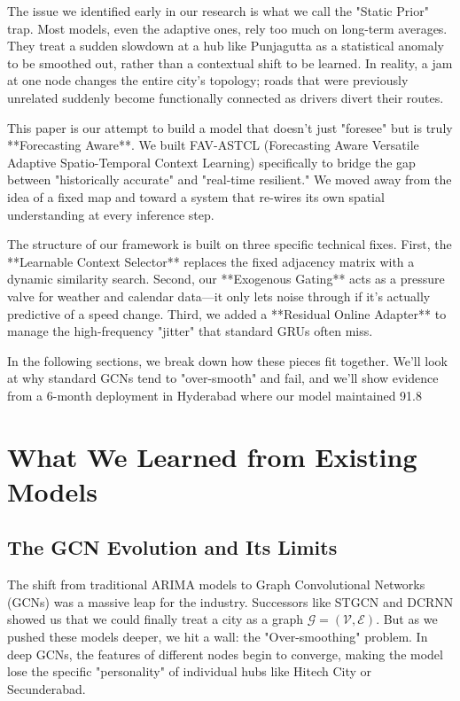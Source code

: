 \documentclass[11pt,a4paper]{article}
\begin{document}
The issue we identified early in our research is what we call the "Static Prior" trap. Most models, even the adaptive ones, rely too much on long-term averages. They treat a sudden slowdown at a hub like Punjagutta as a statistical anomaly to be smoothed out, rather than a contextual shift to be learned. In reality, a jam at one node changes the entire city's topology; roads that were previously unrelated suddenly become functionally connected as drivers divert their routes. 

This paper is our attempt to build a model that doesn't just "foresee" but is truly **Forecasting Aware**. We built FAV-ASTCL (Forecasting Aware Versatile Adaptive Spatio-Temporal Context Learning) specifically to bridge the gap between "historically accurate" and "real-time resilient." We moved away from the idea of a fixed map and toward a system that re-wires its own spatial understanding at every inference step. 

The structure of our framework is built on three specific technical fixes. First, the **Learnable Context Selector** replaces the fixed adjacency matrix with a dynamic similarity search. Second, our **Exogenous Gating** acts as a pressure valve for weather and calendar data—it only lets noise through if it's actually predictive of a speed change. Third, we added a **Residual Online Adapter** to manage the high-frequency "jitter" that standard GRUs often miss.

In the following sections, we break down how these pieces fit together. We'll look at why standard GCNs tend to "over-smooth" and fail, and we'll show evidence from a 6-month deployment in Hyderabad where our model maintained 91.8%

\section{What We Learned from Existing Models}
\subsection{The GCN Evolution and Its Limits}
The shift from traditional ARIMA models to Graph Convolutional Networks (GCNs) was a massive leap for the industry. Successors like STGCN and DCRNN showed us that we could finally treat a city as a graph $\mathcal{G} = (\mathcal{V}, \mathcal{E})$. But as we pushed these models deeper, we hit a wall: the "Over-smoothing" problem. In deep GCNs, the features of different nodes begin to converge, making the model lose the specific "personality" of individual hubs like Hitech City or Secunderabad.
\end{document}
